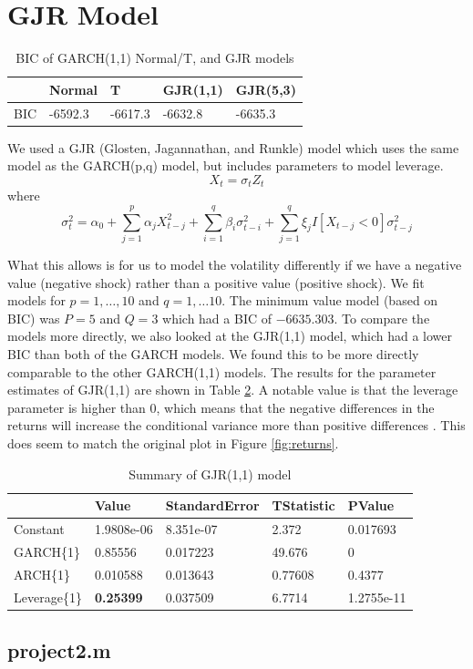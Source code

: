 \documentclass{article}
\begin{document}
\section*{GJR Model}

\begin{table}[H]
  \centering
\begin{tabular}{l | l l l l}
& Normal & T & GJR(1,1) & GJR(5,3)\\ \hline
BIC & -6592.3 & -6617.3 & -6632.8 & -6635.3 \\
\end{tabular}
\caption{BIC of GARCH(1,1) Normal/T, and GJR models}
\label{tab:bic_compare}
\end{table}

We used a GJR (Glosten, Jagannathan, and Runkle) \cite{gjr1993} model which uses the same model as the GARCH(p,q) model, but includes parameters to model leverage.
$$
X_t = \sigma_t Z_t
$$
where
$$
\sigma_t^2 = \alpha_0 + \sum_{j = 1}^p \alpha_j X_{t - j}^2 + \sum_{i = 1}^q \beta_i \sigma_{t - i}^2 + \sum_{j = 1}^q \xi_j I [X_{t - j} < 0] \sigma_{t - j}^2
$$

What this allows is for us to model the volatility differently if we have a negative value (negative shock) rather than a positive value (positive shock).
We fit models for $p = 1,\ldots, 10$ and $q = 1,\ldots 10$. The minimum value model (based on BIC) was $P = 5$ and $Q = 3$ which had a BIC of $-6635.303$.
To compare the models more directly, we also looked at the GJR(1,1) model, which had a lower BIC than both of the GARCH models.
We found this to be more directly comparable to the other GARCH(1,1) models.
The results for the parameter estimates of GJR(1,1) are shown in Table \ref{tab:gjr_summary}.
A notable value is that the leverage parameter is higher than 0, which means that the negative differences in the returns will increase the conditional variance more than positive differences \cite{leverage2017}.
This does seem to match the original plot in Figure \ref{fig:returns}.

\begin{table}[H]
  \centering
\begin{tabular}{l | l l l l}
  & Value & StandardError  &  TStatistic  &    PValue                      \\
  \hline
Constant & 1.9808e-06   &   8.351e-07    &     2.372    &    0.017693   \\
GARCH\{1\}    &      0.85556   &    0.017223   &     49.676    &           0 \\
ARCH\{1\}    &      0.010588   &    0.013643   &    0.77608   &       0.4377 \\
Leverage\{1\}   &    \textbf{0.25399}   &    0.037509   &     6.7714  &    1.2755e-11
\end{tabular}
\caption{Summary of GJR(1,1) model}
\label{tab:gjr_summary}
\end{table}

\begin{appendices}

\subsection{project2.m}


\end{appendices}



\end{document}
